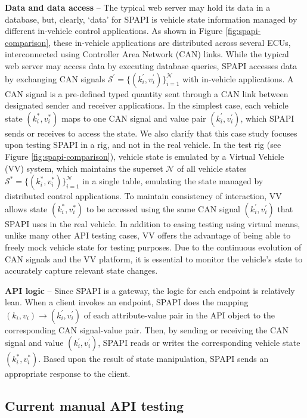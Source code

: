 \noindent \textbf{Data and data access} -- The typical web server may hold its data in a database, but, clearly, `data' for SPAPI is vehicle state information managed by different in-vehicle control applications. As shown in Figure \ref{fig:spapi-comparison}, these in-vehicle applications are distributed across several ECUs, interconnected using Controller Area Network (CAN) links. While the typical web server may access data by executing database queries, SPAPI accesses data by exchanging CAN signals $\mathcal{S}^\prime = \{(k^\prime_i, v^\prime_i)\}_{i=1}^\mathcal{N}$ with in-vehicle applications. A CAN signal is a pre-defined typed quantity sent through a CAN link between designated sender and receiver applications. In the simplest case, each vehicle state $(k^*_i, v^*_i)$ maps to one CAN signal and value pair $(k^\prime_i, v^\prime_i)$, which SPAPI sends or receives to access the state. We also clarify that this case study focuses upon testing SPAPI in a rig, and not in the real vehicle. In the test rig (see Figure \ref{fig:spapi-comparison}), vehicle state is emulated by a Virtual Vehicle (VV) system, which maintains the superset $\mathcal{N}$ of all vehicle states $\mathcal{S}^* = \{(k^*_i, v^*_i)\}_{i=1}^\mathcal{N}$ in a single table, emulating the state managed by distributed control applications. To maintain consistency of interaction, VV allows state $(k^*_i, v^*_i)$ to be accessed using the same CAN signal $(k^\prime_i, v^\prime_i)$ that SPAPI uses in the real vehicle. In addition to easing testing using virtual means, unlike many other API testing cases, VV offers the advantage of being able to freely mock vehicle state for testing purposes. 
Due to the continuous evolution of CAN signals and the VV platform, it is essential to monitor the vehicle's state to accurately capture relevant state changes.



\noindent \textbf{API logic} -- Since SPAPI is a gateway, the logic for each endpoint is relatively lean. When a client invokes an endpoint, SPAPI does the mapping $(k_i, v_i) \rightarrow (k^\prime_i, v^\prime_i)$ of each attribute-value pair in the API object to the corresponding CAN signal-value pair. Then, by sending or receiving the CAN signal and value $(k^\prime_i, v^\prime_i)$, SPAPI reads or writes the corresponding vehicle state $(k^*_i, v^*_i)$. Based upon the result of state manipulation, SPAPI sends an appropriate response to the client. 


\subsection{Current manual API testing}

